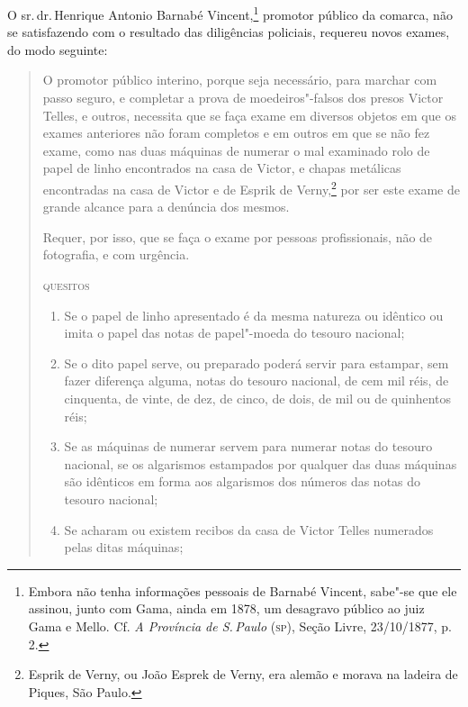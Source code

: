 O sr.\,dr.\,Henrique Antonio Barnabé Vincent,\footnote{Embora não tenha
  informações pessoais de Barnabé Vincent, sabe"-se que ele assinou,
  junto com Gama, ainda em 1878, um desagravo público ao juiz Gama e
  Mello. Cf. \emph{A Província de S.\,Paulo} (\textsc{sp}), Seção Livre,
  23/10/1877, p. 2.} promotor público da comarca, não
se satisfazendo com o resultado das diligências policiais, requereu
novos exames, do modo seguinte:

\begin{quote}
O promotor público interino, porque seja necessário, para marchar com
passo seguro, e completar a prova de moedeiros"-falsos dos presos Victor
Telles, e outros, necessita que se faça exame em diversos objetos em que
os exames anteriores não foram completos e em outros em que se não fez
exame, como nas duas máquinas de numerar o mal examinado rolo de papel
de linho encontrados na casa de Victor, e chapas metálicas encontradas
na casa de Victor e de Esprik de Verny,\footnote{Esprik de Verny, ou
  João Esprek de Verny, era alemão e morava na ladeira de Piques, São
  Paulo.} por ser este exame de grande alcance para a denúncia dos
mesmos.

Requer, por isso, que se faça o exame por pessoas profissionais, não de
fotografia, e com urgência.

\begin{center}
\textsc{quesitos}
\end{center}

\begin{enumerate}[label=\arabic*º]
\item\mbox{} Se o papel de linho apresentado é da mesma natureza ou idêntico ou
imita o papel das notas de papel"-moeda do tesouro nacional;

\item\mbox{} Se o dito papel serve, ou preparado poderá servir para estampar, sem
fazer diferença alguma, notas do tesouro nacional, de cem mil réis, de
cinquenta, de vinte, de dez, de cinco, de dois, de mil ou de quinhentos
réis;

\item\mbox{} Se as máquinas de numerar servem para numerar notas do tesouro
nacional, se os algarismos estampados por qualquer das duas máquinas são
idênticos em forma aos algarismos dos números das notas do tesouro
nacional;

\item\mbox{} Se acharam ou existem recibos da casa de Victor Telles numerados
pelas ditas máquinas;


\end{enumerate}
\end{quote}
